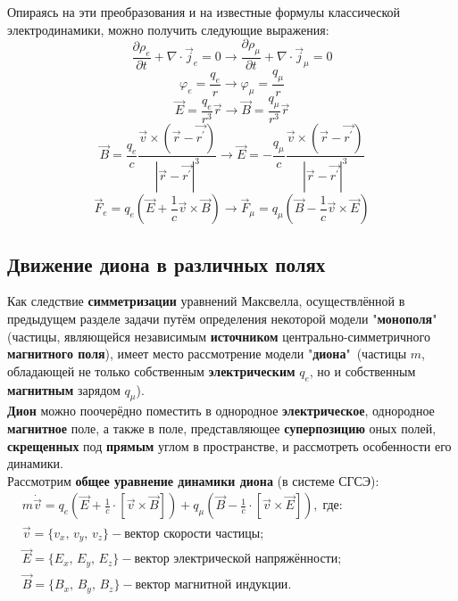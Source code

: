 \documentclass[oneside,final,14pt]{extarticle}
\begin{document}
	Опираясь на эти преобразования и на известные формулы классической электродинамики, можно получить следующие выражения:
	$$\frac{\partial \rho_{e}}{\partial t}+\nabla\cdot\vec j_{e}=0 \rightarrow \frac{\partial \rho_{\mu}}{\partial t}+\nabla\cdot\vec j_{\mu}=0$$
	$$\varphi_{e} = \frac{q_{e}}{r} \rightarrow \varphi_{\mu} = \frac{q_{\mu}}{r} $$
	$$\vec E = \frac{q_{e}}{r^3}\vec r \rightarrow \vec B = \frac{q_{\mu}}{r^3}\vec r$$
	$$\vec B=\frac{q_{e}}{c}\frac{\vec v \times(\vec r - \vec{ r^\prime})}{|\vec r - \vec {r^\prime}|^3} \rightarrow \vec E=-\frac{q_{\mu}}{c}\frac{\vec v \times(\vec r - \vec{ r^\prime})}{|\vec r - \vec {r^\prime}|^3}$$
	$$\vec F_{e}=q_{e}(\vec E + \frac{1}{c}\vec v \times \vec B) \rightarrow \vec F_{\mu}=q_{\mu}(\vec B - \frac{1}{c}\vec v \times \vec E)$$
	
	\newpage
	\subsection{Движение диона в различных полях}
		\noindent Как следствие \textbf{симметризации} уравнений Максвелла, осуществлённой в предыдущем разделе задачи путём определения некоторой модели "\textbf{монополя}"\, (частицы, являющейся независимым \textbf{источником} центрально-симметричного \textbf{магнитного поля}), имеет место рассмотрение модели "\textbf{диона}"\, (частицы $m$, обладающей не только собственным \textbf{электрическим} $q_{e}$, но и собственным \textbf{магнитным} зарядом $q_{\mu}$). \\
		
		\noindent \textbf{Дион} можно поочерёдно поместить в однородное \textbf{электрическое}, однородное \textbf{магнитное} поле, а также в поле, представляющее \textbf{суперпозицию} оных полей, \textbf{скрещенных} под \textbf{прямым} углом в пространстве, и рассмотреть особенности его динамики. \\
		
		\noindent Рассмотрим \textbf{общее уравнение динамики диона} (в системе СГСЭ): \\
		
		\begin{math}
			\begin{aligned}
				& m\dot{\vec{v}} = q_{e}\left(\vec{E} + \frac{1}{c} \cdot \left[\vec{v} \times \vec{B}\right]\right) + q_{\mu}\left(\vec{B} - \frac{1}{c} \cdot \left[\vec{v} \times \vec{E}\right]\right),\; \text{где:} \\
				& \vec{v} = \{v_{x},\, v_{y},\, v_{z}\} - \text{вектор скорости частицы}; \\
				& \vec{E} = \{E_{x},\, E_{y},\, E_{z}\} - \text{вектор электрической напряжённости}; \\
				& \vec{B} = \{B_{x},\, B_{y},\, B_{z}\} - \text{вектор магнитной индукции}.
			\end{aligned}
		\end{math} \\\\
		
\end{document}
